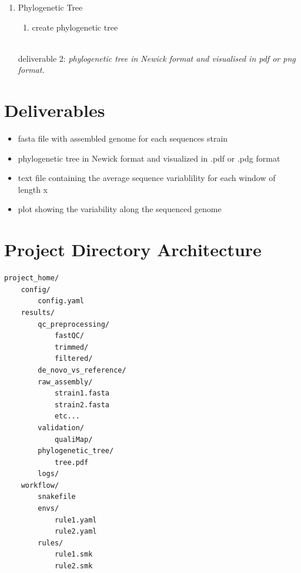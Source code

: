 \documentclass{article}
\begin{document}
\begin{enumerate}
     \\deliverable 1: \textit{fasta file with the assembled genome for each sequenced strain}
     \\deliverable 3: \textit{text file containing the average sequence variability for each window of length x}
     \\deliverable 4:  \textit{plot showing the variability along the sequenced genome}
    \item Phylogenetic Tree
    \begin{enumerate}
        \item create phylogenetic tree
    \end{enumerate}
    \\deliverable 2: \textit{phylogenetic tree in Newick format and visualised in pdf or png format.}
    
\end{enumerate}
\section{Deliverables}
\begin{itemize}
    \item fasta file with assembled genome for each sequences strain
    \item phylogenetic tree in Newick format and visualized in .pdf or .pdg format
    \item text file containing the average sequence variablility for each window of length x
    \item plot showing the variability along the sequenced genome
\end{itemize}

\section{Project Directory Architecture}
\begin{lstlisting}
project_home/
    config/
        config.yaml
    results/
        qc_preprocessing/
            fastQC/
            trimmed/
            filtered/
        de_novo_vs_reference/
        raw_assembly/
            strain1.fasta
            strain2.fasta
            etc...
        validation/
            qualiMap/
        phylogenetic_tree/
            tree.pdf
        logs/
    workflow/
        snakefile
        envs/
            rule1.yaml
            rule2.yaml
        rules/
            rule1.smk
            rule2.smk
\end{lstlisting}
\end{document}
